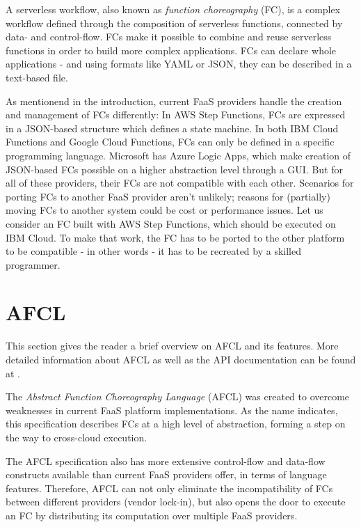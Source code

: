 \documentclass[a4paper,top=25mm,bottom=25mm,12pt,pdftex,halfparskip,twoside,openany,bibtotoc,numbers=noenddot]{scrbook}
\begin{document}
A serverless workflow, also known as \textit{function choreography} (FC), is a complex workflow defined through the composition of serverless functions, connected by data- and control-flow. FCs make it possible to combine and reuse serverless functions in order to build more complex applications. 
FCs can declare whole applications - and using formats like YAML or JSON, they can be described in a text-based file.

As mentionend in the introduction, current FaaS providers handle the creation and management of FCs differently:
In AWS Step Functions, FCs are expressed in a JSON-based structure which defines a state machine.
In both IBM Cloud Functions and Google Cloud Functions, FCs can only be defined in a specific programming language.
Microsoft has Azure Logic Apps, which make creation of JSON-based FCs possible on a higher abstraction level through a GUI.
But for all of these providers, their FCs are not compatible with each other.
Scenarios for porting FCs to another FaaS provider aren't unlikely; reasons for (partially) moving FCs to another system could be cost or performance issues.
Let us consider an FC built with AWS Step Functions, which should be executed on IBM Cloud. 
To make that work, the FC has to be ported to the other platform to be compatible - in other words - it has to be recreated by a skilled programmer.

\section{AFCL}

This section gives the reader a brief overview on AFCL and its features. More detailed information about AFCL as well as the API documentation can be found at \cite{online-afcl-dps}.

The \emph{Abstract Function Choreography Language} (AFCL) was created to overcome weaknesses in current FaaS platform implementations. As the name indicates, this specification describes FCs at a high level of abstraction, forming a step on the way to cross-cloud execution.

The AFCL specification also has more extensive control-flow and data-flow constructs available than current FaaS providers offer, in terms of language features. Therefore, AFCL can not only eliminate the incompatibility of FCs between different providers (vendor lock-in), but also opens the door to execute an FC by distributing its computation over multiple FaaS providers.
\end{document}
